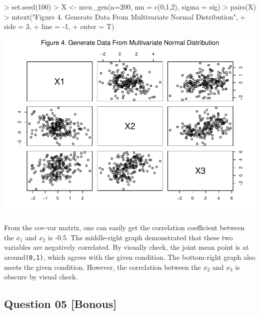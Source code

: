 \documentclass[
]{article}
\newenvironment{Shaded}{\begin{snugshade}}{\end{snugshade}}
\newcommand{\AttributeTok}[1]{\textcolor[rgb]{0.77,0.63,0.00}{#1}}
\newcommand{\DecValTok}[1]{\textcolor[rgb]{0.00,0.00,0.81}{#1}}
\newcommand{\FunctionTok}[1]{\textcolor[rgb]{0.00,0.00,0.00}{#1}}
\newcommand{\NormalTok}[1]{#1}
\newcommand{\OtherTok}[1]{\textcolor[rgb]{0.56,0.35,0.01}{#1}}
\newcommand{\SpecialCharTok}[1]{\textcolor[rgb]{0.00,0.00,0.00}{#1}}
\newcommand{\StringTok}[1]{\textcolor[rgb]{0.31,0.60,0.02}{#1}}
\begin{document}
\begin{Shaded}
\begin{Highlighting}[]
\SpecialCharTok{\textgreater{}} \FunctionTok{set.seed}\NormalTok{(}\DecValTok{100}\NormalTok{)}
\SpecialCharTok{\textgreater{}}\NormalTok{ X }\OtherTok{\textless{}{-}} \FunctionTok{mvn\_gen}\NormalTok{(}\AttributeTok{n=}\DecValTok{200}\NormalTok{, }\AttributeTok{mu =} \FunctionTok{c}\NormalTok{(}\DecValTok{0}\NormalTok{,}\DecValTok{1}\NormalTok{,}\DecValTok{2}\NormalTok{), }\AttributeTok{sigma =}\NormalTok{ sig)}
\SpecialCharTok{\textgreater{}} \FunctionTok{pairs}\NormalTok{(X)}
\SpecialCharTok{\textgreater{}} \FunctionTok{mtext}\NormalTok{(}\StringTok{"Figure 4. Generate Data From Multivariate Normal Distribution"}\NormalTok{,}
\SpecialCharTok{+}       \AttributeTok{side =} \DecValTok{3}\NormalTok{,}
\SpecialCharTok{+}       \AttributeTok{line =} \SpecialCharTok{{-}}\DecValTok{1}\NormalTok{,}
\SpecialCharTok{+}       \AttributeTok{outer =}\NormalTok{ T)}
\end{Highlighting}
\end{Shaded}

\includegraphics[width=1\linewidth,height=0.5\textheight]{HW_02_Chenguang_Pan_files/figure-latex/unnamed-chunk-5-1}

From the cov-var matrix, one can easily get the correlation coefficient
between the \(x_1\) and \(x_2\) is -0.5. The middle-right graph
demonstrated that these two variables are negatively correlated. By
visually check, the joint mean point is at around\texttt{(0,1)}, which
agrees with the given condition. The bottom-right graph also meets the
given condition. However, the correlation between the \(x_2\) and
\(x_3\) is obscure by visual check.

\hypertarget{question-05-bonous}{%
\subsection{Question 05 {[}Bonous{]}}\label{question-05-bonous}}
\end{document}
